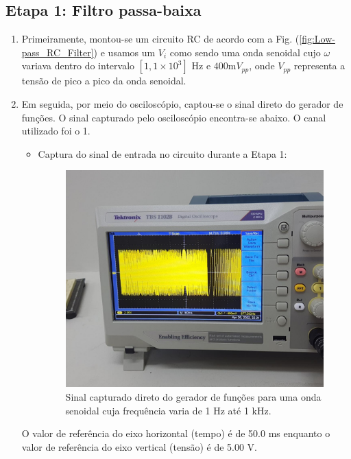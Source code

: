 \documentclass[letterpaper, 12pt]{article}
\begin{document}
\subsection{Etapa 1: Filtro passa-baixa}\label{Etapa 1}
\begin{enumerate}
    \item Primeiramente, montou-se um circuito RC de acordo com a Fig. (\ref{fig:Low-pass_RC_Filter}) e usamos um $V_{i}$ como sendo uma onda senoidal cujo $\omega$ variava dentro do intervalo $[1,1\times10^{3}]$ Hz e $400\text{m}V_{pp}$, onde $V_{pp}$ representa a tensão de pico a pico da onda senoidal.
    
    \item Em seguida, por meio do osciloscópio, captou-se o sinal direto do gerador de funções. O sinal capturado pelo osciloscópio encontra-se abaixo. O canal utilizado foi o 1.
    
    \begin{itemize}
        \item Captura do sinal de entrada no circuito durante a Etapa 1:
        \begin{figure}[h]
            \centering
            \includegraphics[width=0.5\linewidth]{figures/Input_signal.jpeg}
            \caption{Sinal capturado direto do gerador de funções para uma onda senoidal cuja frequência varia de 1 Hz até 1 kHz.}
            \label{fig:Input_signal}
        \end{figure}
    \end{itemize}
    
    O valor de referência do eixo horizontal (tempo) é de 50.0 ms enquanto o valor de referência do eixo vertical (tensão) é de 5.00 V.
    

\end{enumerate}
\end{document}
